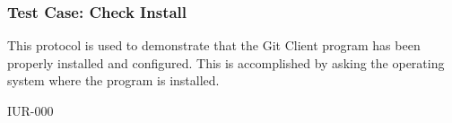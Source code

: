 \subsubsection{Test Case: Check Install}
\begin{description}[align=right,leftmargin=3.2cm,labelindent=3.0cm]
\item[Purpose:] This protocol is used to demonstrate that the Git Client program has been properly installed and configured. This is accomplished by asking the operating system where the program is installed.
\item[Requirement:] IUR-000
\end{description}

